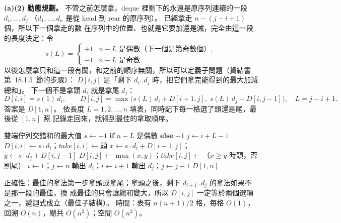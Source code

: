 \begin{pastsoln}
\textbf{(a)(2) 動態規劃。} 不管之前怎麼拿，deque 裡剩下的永遠是原序列連續的一段 $d_i, \ldots, d_j$
（$d_1, \ldots, d_n$ 是從 head 到 rear 的原序列）。 已經拿走 $n - (j - i + 1)$ 個，所以下一個拿走的數
在序列中的位置、也就是它要加還是減，完全由這一段的長度決定：令
\[
s(L) = \begin{cases} +1 & n - L \text{ 是偶數（下一個是第奇數個）},\\ -1 & n - L \text{ 是奇數}.\end{cases}
\]
以後怎麼拿只和這一段有關，和之前的順序無關，所以可以定義子問題（資結書第~18.1.5~節的步驟）：
$D[i, j]$ 是「剩下 $d_i..d_j$ 時，把它們拿完能得到的最大加減總和」。 下一個不是拿頭 $d_i$ 就是拿尾
$d_j$：
\[
D[i, i] = s(1)\, d_i, \qquad
D[i, j] = \max\bigl(s(L)\, d_i + D[i+1, j],\; s(L)\, d_j + D[i, j-1]\bigr),\quad L = j - i + 1.
\]
答案是 $D[1, n]$。 依長度 $L = 1, 2, \ldots, n$ 填表，同時記下每一格選了頭還是尾，最後從 $[1, n]$ 照
記錄走回來，就得到最佳的拿取順序。
\begin{pseudo}{雙端佇列交錯和的最大值}
        \State $s \gets +1$ \textbf{if} $n - L$ 是偶數 \textbf{else} $-1$
            \State $j \gets i + L - 1$
                \State $D[i, i] \gets s \cdot d_i$；$\mathit{take}[i, i] \gets \text{頭}$
            \Else
                \State $x \gets s \cdot d_i + D[i+1, j]$；$y \gets s \cdot d_j + D[i, j-1]$
                \State $D[i, j] \gets \max(x, y)$；$\mathit{take}[i, j] \gets$（$x \ge y$ 時頭，否則尾）
            \EndIf
        \EndFor
    \EndFor
    \State $i \gets 1$；$j \gets n$
     
            \State 輸出 $d_i$；$i \gets i + 1$
        \Else
            \State 輸出 $d_j$；$j \gets j - 1$
        \EndIf
    \EndWhile
    \State \Return $D[1, n]$
\EndFunction
\end{pseudo}
正確性：最佳的拿法第一步拿頭或拿尾；拿頭之後，剩下 $d_{i+1}..d_j$ 的拿法如果不是那一段的最佳，換
成最佳的只會讓總和變大，所以 $D[i, j]$ 一定等於兩個選項之一，遞迴式成立（最佳子結構）。 時間：表有
$n(n+1)/2$ 格，每格 $O(1)$，回溯 $O(n)$，總共 $O(n^2)$；空間 $O(n^2)$。


\end{pastsoln}
